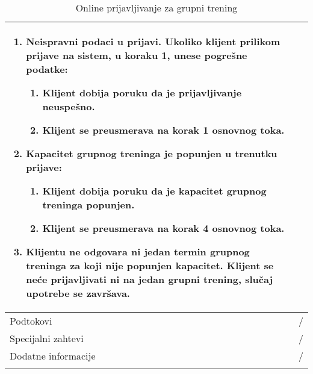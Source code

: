 \documentclass[../grupniTreninzi.tex]{subfiles}
\begin{document}
\begin{longtable}{| p{} | p{} |}
\begin{enumerate}
        \item Neispravni podaci u prijavi. Ukoliko klijent prilikom prijave na sistem, u koraku 1, unese pogrešne podatke:
            \begin{enumerate}
                \item Klijent dobija poruku da je prijavljivanje neuspešno.
                \item Klijent se preusmerava na korak 1 osnovnog toka.
            \end{enumerate}    
        \item Kapacitet grupnog treninga je popunjen u trenutku prijave:
            \begin{enumerate}
                \item Klijent dobija poruku da je kapacitet grupnog treninga popunjen.
                \item Klijent se preusmerava na korak 4 osnovnog toka.
            \end{enumerate}
        \item Klijentu ne odgovara ni jedan termin grupnog treninga za koji nije popunjen kapacitet. Klijent se neće prijavljivati ni na jedan grupni trening, slučaj upotrebe se završava.
        
    \end{enumerate}\\
\hline
    Podtokovi & /\\
\hline
    Specijalni zahtevi & /\\
\hline
    Dodatne informacije & /\\
\hline
\caption{Online prijavljivanje za grupni trening} %
\end{longtable}
\end{document}
